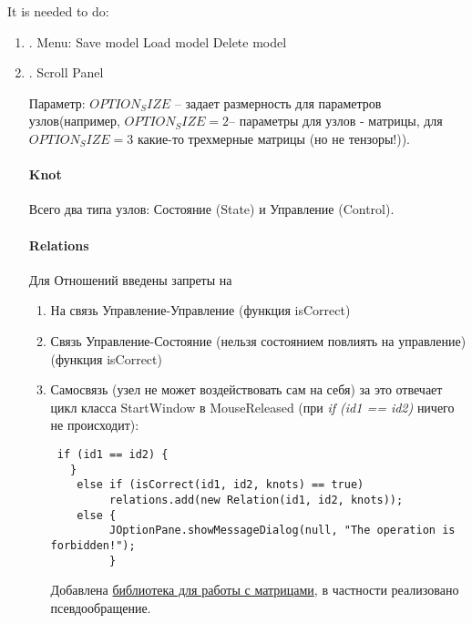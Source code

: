 \documentclass{article}
\begin{document}
\pagestyle{empty}

It is needed to do:
\begin{enumerate}
\item{.} Menu:
 Save model
 Load model
 Delete model

\item{.}  Scroll Panel

Параметр: $OPTION_SIZE$ -- задает размерность для параметров узлов(например, $OPTION_SIZE = 2$-- параметры для узлов - матрицы, для $OPTION_SIZE = 3$ какие-то трехмерные матрицы (но не тензоры!)).

\paragraph{Knot}
Всего два типа узлов: Состояние (State) и Управление (Control).


\paragraph{Relations} 
Для Отношений введены запреты на 
\begin{enumerate}
\item На связь Управление-Управление (функция isCorrect)
\item Связь Управление-Состояние (нельзя состоянием повлиять на управление) (функция isCorrect)
\item Самосвязь (узел не может воздействовать сам на себя) за это отвечает цикл класса StartWindow
в MouseReleased (при {\it{if (id1 == id2)}} ничего не происходит):
\begin{verbatim}
 if (id1 == id2) {
   }
    else if (isCorrect(id1, id2, knots) == true)
         relations.add(new Relation(id1, id2, knots));
    else {
         JOptionPane.showMessageDialog(null, "The operation is forbidden!");
         }
\end{verbatim}

Добавлена \href{http://javadox.com/com.googlecode.efficient-java-matrix-library/ejml/0.23/org/ejml/alg/dense/linsol/svd/SolvePseudoInverseSvd.html}{библиотека для работы с матрицами}, в частности реализовано псевдообращение.


\end{enumerate}



\end{enumerate}
\end{document}
